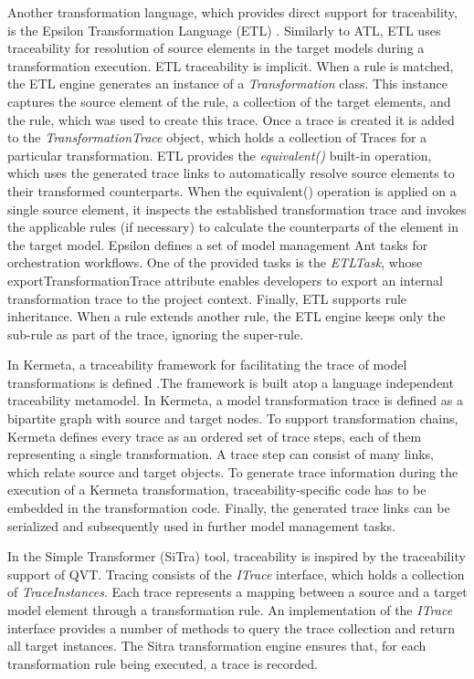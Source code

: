 \documentclass[runningheads,a4paper]{llncs}
\begin{document}
Another transformation language, which provides direct support for traceability,
is the Epsilon Transformation Language (ETL) \cite{kolovos2008epsilon}.
Similarly to ATL, ETL uses traceability for resolution of source elements in the
target models during a transformation execution. ETL traceability is implicit.
When a rule is matched, the ETL engine generates an instance of a
\emph{Transformation} class. This instance captures the source element of the
rule, a collection of the target elements, and the rule, which was used to
create this trace. Once a trace  is created it is added to the
\emph{TransformationTrace} object, which holds a collection of Traces for a
particular transformation. ETL provides the \emph{equivalent()} built-in
operation, which uses the generated trace links  to automatically resolve source
elements to their transformed counterparts. When the equivalent() operation is
applied on a single source element, it inspects the established transformation
trace and invokes the applicable rules (if necessary) to calculate the
counterparts of the element in the target model. Epsilon defines a set of model
management Ant tasks for orchestration workflows. One of the provided tasks is
the \emph{ETLTask}, whose exportTransformationTrace attribute  enables
developers to export an internal transformation trace to the project context.
Finally, ETL supports rule inheritance. When a rule extends another rule, the
ETL engine keeps only the sub-rule as part of the trace, ignoring the
super-rule.

In Kermeta, a traceability framework for facilitating  the trace of model
transformations is defined \cite{falleri2006towards}.The framework is built atop
a language independent traceability metamodel. In Kermeta, a model
transformation trace is defined as a bipartite graph with source and target
nodes. To support transformation chains, Kermeta defines every trace as an
ordered set of trace steps, each of them representing a single transformation. A
trace step can consist of many links, which relate source and target objects. To
generate trace information during the execution of a Kermeta transformation,
traceability-specific code has to be embedded in the transformation code.
Finally, the generated trace links can be serialized and subsequently used in
further model management tasks.


In the Simple Transformer (SiTra) tool, traceability is inspired by the
traceability support of QVT. Tracing consists of the \emph{ITrace} interface,
which holds a collection of \emph{TraceInstances}. Each trace represents a
mapping between a source and a target model element through a transformation
rule. An implementation of the \emph{ITrace} interface provides a number of
methods to query the trace collection and return all target instances. The Sitra
transformation engine ensures that, for each transformation rule being executed,
a trace is recorded.
\end{document}
